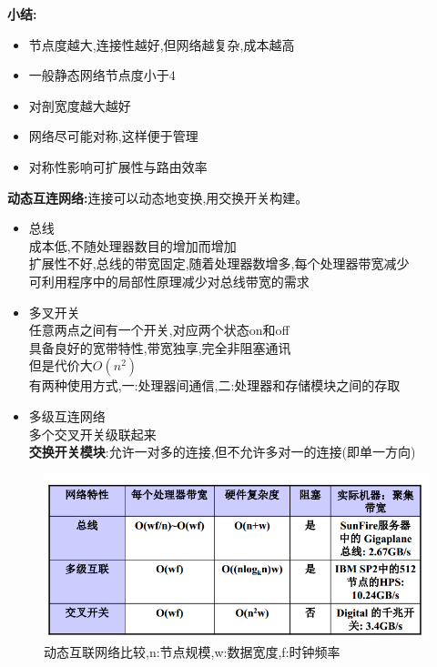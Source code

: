 \documentclass[UTF8,a4paper]{ctexart}
\newcommand{\spaceline}{\vspace{\baselineskip}}
\begin{document}
  \textbf{小结:}
  \begin{itemize}
    \item 节点度越大,连接性越好,但网络越复杂,成本越高
    \item 一般静态网络节点度小于4
    \item 对剖宽度越大越好
    \item 网络尽可能对称,这样便于管理
    \item 对称性影响可扩展性与路由效率
  \end{itemize}

  \spaceline
  \textbf{动态互连网络:}连接可以动态地变换,用交换开关构建。
  \begin{itemize}
    \item 总线\\
    成本低,不随处理器数目的增加而增加\\
    扩展性不好,总线的带宽固定,随着处理器数增多,每个处理器带宽减少\\
    可利用程序中的局部性原理减少对总线带宽的需求
    \item 多叉开关\\
    任意两点之间有一个开关,对应两个状态on和off\\
    具备良好的宽带特性,带宽独享,完全非阻塞通讯\\
    但是代价大$O(n^2)$\\
    有两种使用方式,一:处理器间通信,二:处理器和存储模块之间的存取
    \item 多级互连网络\\
    多个交叉开关级联起来\\
    \textbf{交换开关模块}:允许一对多的连接,但不允许多对一的连接(即单一方向)
  \end{itemize}

  \begin{figure}[H]
    \centering
    \includegraphics[scale = 0.5]{assets/ParallelComputing_3cbfc.png}
    \caption{动态互联网络比较,n:节点规模,w:数据宽度,f:时钟频率}
  \end{figure}
\end{document}
